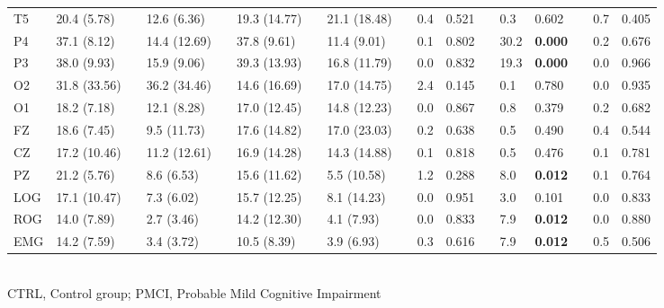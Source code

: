\documentclass[10pt]{article}
\begin{document}
\begin{table}
\begin{small}
\begin{tabular}{lllllllllllllllll}
T5 &20.4 (5.78)&&12.6 (6.36)&&19.3 (14.77)&&21.1 (18.48)&&0.4 &0.521 & &0.3 &0.602 & &0.7 &0.405 \\
P4 &37.1 (8.12)&&14.4 (12.69)&&37.8 (9.61)&&11.4 (9.01)&&0.1 &0.802 & &30.2 &\bf 0.000 & &0.2 &0.676 \\
P3 &38.0 (9.93)&&15.9 (9.06)&&39.3 (13.93)&&16.8 (11.79)&&0.0 &0.832 & &19.3 &\bf 0.000 & &0.0 &0.966 \\
O2 &31.8 (33.56)&&36.2 (34.46)&&14.6 (16.69)&&17.0 (14.75)&&2.4 &0.145 & &0.1 &0.780 & &0.0 &0.935 \\
O1 &18.2 (7.18)&&12.1 (8.28)&&17.0 (12.45)&&14.8 (12.23)&&0.0 &0.867 & &0.8 &0.379 & &0.2 &0.682 \\
FZ &18.6 (7.45)&&9.5 (11.73)&&17.6 (14.82)&&17.0 (23.03)&&0.2 &0.638 & &0.5 &0.490 & &0.4 &0.544 \\
CZ &17.2 (10.46)&&11.2 (12.61)&&16.9 (14.28)&&14.3 (14.88)&&0.1 &0.818 & &0.5 &0.476 & &0.1 &0.781 \\
PZ &21.2 (5.76)&&8.6 (6.53)&&15.6 (11.62)&&5.5 (10.58)&&1.2 &0.288 & &8.0 &\bf 0.012 & &0.1 &0.764 \\
LOG &17.1 (10.47)&&7.3 (6.02)&&15.7 (12.25)&&8.1 (14.23)&&0.0 &0.951 & &3.0 &0.101 & &0.0 &0.833 \\
ROG &14.0 (7.89)&&2.7 (3.46)&&14.2 (12.30)&&4.1 (7.93)&&0.0 &0.833 & &7.9 &\bf 0.012 & &0.0 &0.880 \\
EMG &14.2 (7.59)&&3.4 (3.72)&&10.5 (8.39)&&3.9 (6.93)&&0.3 &0.616 & &7.9 &\bf 0.012 & &0.5 &0.506 \\
\bottomrule
\end{tabular}\\
CTRL, Control group; PMCI, Probable Mild Cognitive Impairment
\end{small}
\end{table}
\end{document}
